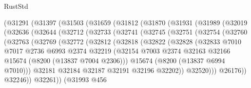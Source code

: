 \begin{lexlean}{RustStd}
\begin{coremodule}
    (@31291
      (@31397
        (@31503
          (@31659
            (@31812
              (@31870
                (@31931
                  (@31989
                    (@32019
                      (@32636
                        (@32644
                          (@32712
                            (@32733
                              (@32741
                                (@32745
                                  (@32751
                                    (@32754
                                      (@32760
                                        (@32763
                                          (@32769
                                            (@32772
                                              (@32812
                                                (@32818
                                                  (@32822
                                                    (@32828
                                                      (@32833
                                                        @7010
                                                        @7017
                                                        @2736
                                                        @6993
                                                        @2374
                                                        @32219
                                                        (@32154
                                                          @7003
                                                          @2374
                                                          @32163
                                                          @32166
                                                          @15674
                                                          (@8200 (@13837 @7004 @2306)))
                                                        @15674
                                                        (@8200 (@13837 @6994 @7010)))
                                                      @32181
                                                      @32184
                                                      @32187
                                                      @32191
                                                      @32196
                                                      @32202))
                                                  @32520)))
                                            @26176))
                                        @32246))
                                    @32261))
                                (@31993
                                  @456

\end{coremodule}
\end{lexlean}
